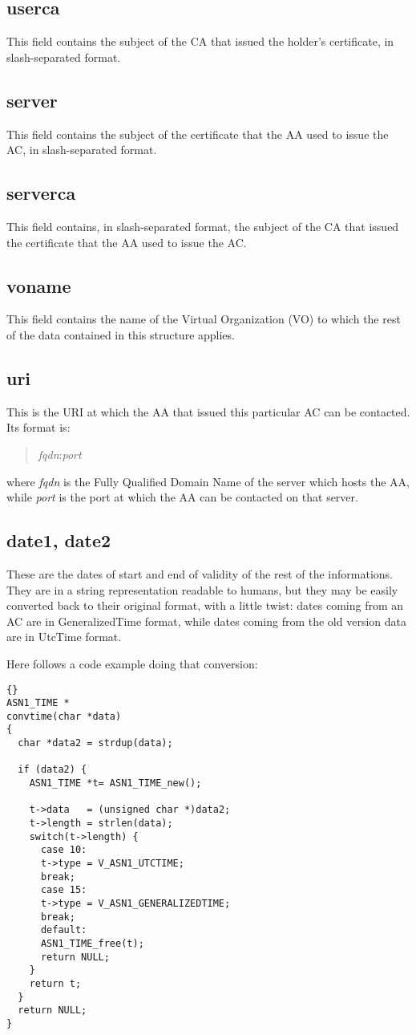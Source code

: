 \documentclass[a4paper]{book}
\begin{document}
\subsection{userca}
This field contains the subject of the CA that issued the holder's
certificate, in slash-separated format.

\subsection{server}
This field contains the subject of the certificate that the AA used to
issue the AC, in slash-separated format.

\subsection{serverca}
This field contains, in slash-separated format, the subject of the CA that
issued the certificate that the AA used to issue the AC.

\subsection{voname}
This field contains the name of the Virtual Organization (VO) to which
the rest of the data contained in this structure applies.

\subsection{uri}
This is the URI at which the AA that issued this particular AC can be
contacted. Its format is:
\begin{quote}
\emph{fqdn}:\emph{port}
\end{quote}
where \emph{fqdn} is the Fully Qualified Domain Name of the server
which hosts the AA, while \emph{port} is the port at which the AA can
be contacted on that server.

\subsection{date1, date2}
These are the dates of start and end of validity of the rest of the
informations.  They are in a string representation readable to humans,
but they may be easily converted back to their original format, with a
little twist: dates coming from an AC are in GeneralizedTime format,
while dates coming from the old version data are in UtcTime format.

Here follows a code example doing that conversion:\bigskip\bigskip
{\begin{lstlisting}{}
ASN1_TIME *
convtime(char *data)
{
  char *data2 = strdup(data);

  if (data2) {
    ASN1_TIME *t= ASN1_TIME_new();

    t->data   = (unsigned char *)data2;
    t->length = strlen(data);
    switch(t->length) {
      case 10:
      t->type = V_ASN1_UTCTIME;
      break;
      case 15:
      t->type = V_ASN1_GENERALIZEDTIME;
      break;
      default:
      ASN1_TIME_free(t);
      return NULL;
    }
    return t;
  }
  return NULL;
}
\end{lstlisting}}
\end{document}
